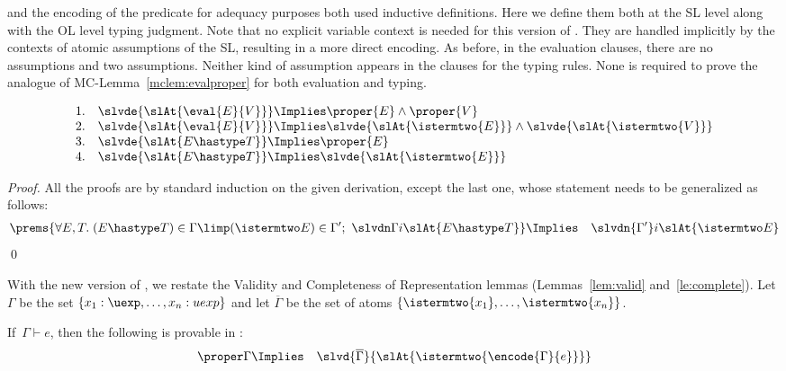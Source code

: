 \documentclass[final]{svjour3}
\begin{document}
and the encoding of the  predicate for adequacy purposes
both used inductive definitions.  Here we define them both at the SL
level along with the OL level typing judgment.
Note that no explicit variable context is needed for this version of
.
They are handled implicitly by the contexts of atomic
assumptions of the SL, resulting in a more direct encoding.
As before, in the evaluation clauses, there are no 
assumptions and two  assumptions.  Neither kind of
assumption appears in the clauses for the typing rules.  None is
required to prove the analogue of MC-Lemma~\ref{mclem:evalproper} for
both evaluation and typing.
\begin{mclemma}
$$\begin{array}{rl}
1. & \slvde{\slAt{\eval{E}{V}}} \Implies \proper{E}\land \proper{V}
\\
2. & \slvde{\slAt{\eval{E}{V}}} \Implies
     \slvde{\slAt{\istermtwo{E}}}\land\slvde{\slAt{\istermtwo{V}}}\\
3. & \slvde{\slAt{E\hastype T}} \Implies \proper{E}\\
4. & \slvde{\slAt{E\hastype T}} \Implies \slvde{\slAt{\istermtwo{E}}}
\end{array}$$
\label{mclem:twoleveladeq}
\end{mclemma}
\begin{proof}
  All the proofs are by standard induction on the given derivation,
  except the last one, whose statement needs to be generalized as
  follows:
  \begin{eqnarray*}
    \prems{\forall E,T.\; (E\hastype T)\in\Gamma \limp (\istermtwo E)
      \in \Gamma';\  
      \slvdn \Gamma i {\slAt{E\hastype T}} } 
    & \Implies &  \slvdn {\Gamma'} i {\slAt{\istermtwo E}}
  \end{eqnarray*}
  \qed\end{proof} With the new version of , we restate the
Validity and Completeness of Representation lemmas
(Lemmas~\ref{lem:valid} and~\ref{le:complete}). Let $\Gamma$ be the
set $ \{x_1: \uexp,\dots,x_n:uexp\}$ and let $\overline{\Gamma}$ be
the set of atoms $\{\istermtwo{x_1},\ldots,\istermtwo{x_n}\}$.

\begin{lem}
If\ $\Gamma\vdash e$, then the following is provable in \HOL:
\begin{eqnarray*}
\proper \Gamma &\Implies&
 \slvd{\overline{\Gamma}}{\slAt{\istermtwo{\encode{\Gamma}{e}}}}  
\end{eqnarray*}
\end{lem}
\end{document}
